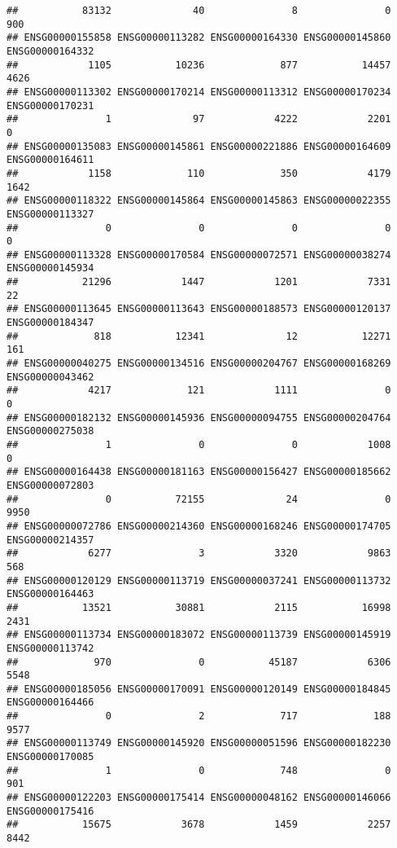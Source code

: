 \documentclass[
]{article}
\begin{document}
\begin{verbatim}
##           83132              40               8               0             900 
## ENSG00000155858 ENSG00000113282 ENSG00000164330 ENSG00000145860 ENSG00000164332 
##            1105           10236             877           14457            4626 
## ENSG00000113302 ENSG00000170214 ENSG00000113312 ENSG00000170234 ENSG00000170231 
##               1              97            4222            2201               0 
## ENSG00000135083 ENSG00000145861 ENSG00000221886 ENSG00000164609 ENSG00000164611 
##            1158             110             350            4179            1642 
## ENSG00000118322 ENSG00000145864 ENSG00000145863 ENSG00000022355 ENSG00000113327 
##               0               0               0               0               0 
## ENSG00000113328 ENSG00000170584 ENSG00000072571 ENSG00000038274 ENSG00000145934 
##           21296            1447            1201            7331              22 
## ENSG00000113645 ENSG00000113643 ENSG00000188573 ENSG00000120137 ENSG00000184347 
##             818           12341              12           12271             161 
## ENSG00000040275 ENSG00000134516 ENSG00000204767 ENSG00000168269 ENSG00000043462 
##            4217             121            1111               0               0 
## ENSG00000182132 ENSG00000145936 ENSG00000094755 ENSG00000204764 ENSG00000275038 
##               1               0               0            1008               0 
## ENSG00000164438 ENSG00000181163 ENSG00000156427 ENSG00000185662 ENSG00000072803 
##               0           72155              24               0            9950 
## ENSG00000072786 ENSG00000214360 ENSG00000168246 ENSG00000174705 ENSG00000214357 
##            6277               3            3320            9863             568 
## ENSG00000120129 ENSG00000113719 ENSG00000037241 ENSG00000113732 ENSG00000164463 
##           13521           30881            2115           16998            2431 
## ENSG00000113734 ENSG00000183072 ENSG00000113739 ENSG00000145919 ENSG00000113742 
##             970               0           45187            6306            5548 
## ENSG00000185056 ENSG00000170091 ENSG00000120149 ENSG00000184845 ENSG00000164466 
##               0               2             717             188            9577 
## ENSG00000113749 ENSG00000145920 ENSG00000051596 ENSG00000182230 ENSG00000170085 
##               1               0             748               0             901 
## ENSG00000122203 ENSG00000175414 ENSG00000048162 ENSG00000146066 ENSG00000175416 
##           15675            3678            1459            2257            8442 

\end{verbatim}
\end{document}
